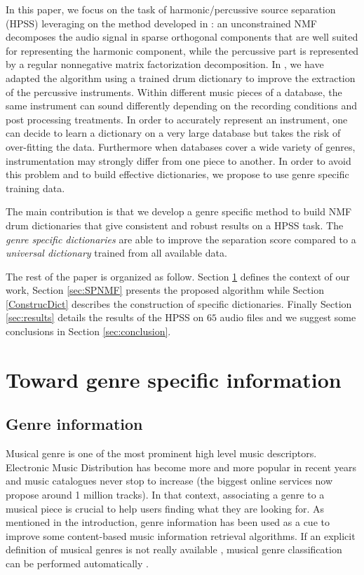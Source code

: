 \documentclass{article}
\begin{document}
In this paper, we focus on the task of harmonic/percussive source separation (HPSS) leveraging on the method developed in \cite{laroche2015structuredhidden}: an unconstrained NMF decomposes the audio signal in sparse orthogonal components that are well suited for representing the harmonic component, while the percussive part is represented by a regular nonnegative matrix factorization decomposition. In \cite{larocheJournalhidden}, we have adapted the algorithm using a trained drum dictionary to improve the extraction of the percussive instruments. Within different music pieces of a database, the same instrument can sound differently depending on the recording conditions and post processing treatments. In order to accurately represent an instrument, one can decide to learn a dictionary on a very large database but takes the risk of over-fitting the data. Furthermore when databases cover a wide variety of genres, instrumentation may strongly differ from one piece to another. In order to avoid this problem and to build effective dictionaries, we propose to use genre specific training data.

The main contribution is that we develop a genre specific method to build NMF drum dictionaries that give consistent and robust results on a HPSS task. The \emph{genre specific dictionaries} are able to improve the separation score compared to a \emph{universal dictionary} trained from all available data. 


The rest of the paper is organized as follow. Section \ref{defgenre} defines the context of our work, Section \ref{sec:SPNMF} presents the proposed algorithm while Section \ref{ConstrucDict} describes the construction of specific dictionaries. Finally Section \ref{sec:results} details the results of the HPSS on $65$ audio files and  we suggest some conclusions in Section \ref{sec:conclusion}. 



\section{Toward genre specific information}\label{defgenre}

\subsection{Genre information}

Musical genre is one of the most prominent high level music descriptors. Electronic Music Distribution has become more and more popular in recent years and music catalogues never stop to increase (the biggest online services now propose around 1 million tracks). In that context, associating a genre to a musical piece is crucial to help users finding what they are looking for. As mentioned in the introduction, genre information has been used as a cue to improve some content-based music information retrieval algorithms. If an explicit definition of musical genres is not really available \cite{aucouturier2003representing}, musical genre classification can be performed automatically \cite{li2003comparative}. %
\end{document}
